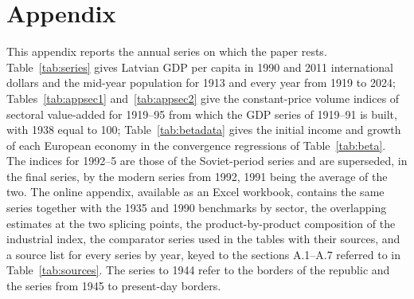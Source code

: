 \section*{Appendix}
\setcounter{table}{0}
\renewcommand{\thetable}{A\arabic{table}}

This appendix reports the annual series on which the paper rests. Table~\ref{tab:series} gives Latvian GDP per capita in 1990 and 2011 international dollars and the mid-year population for 1913 and every year from 1919 to 2024; Tables~\ref{tab:appsec1} and~\ref{tab:appsec2} give the constant-price volume indices of sectoral value-added for 1919--95 from which the GDP series of 1919--91 is built, with 1938 equal to 100; Table~\ref{tab:betadata} gives the initial income and growth of each European economy in the convergence regressions of Table~\ref{tab:beta}. The indices for 1992--5 are those of the Soviet-period series and are superseded, in the final series, by the modern series from 1992, 1991 being the average of the two. The online appendix, available as an Excel workbook, contains the same series together with the 1935 and 1990 benchmarks by sector, the overlapping estimates at the two splicing points, the product-by-product composition of the industrial index, the comparator series used in the tables with their sources, and a source list for every series by year, keyed to the sections A.1--A.7 referred to in Table~\ref{tab:sources}. The series to 1944 refer to the borders of the republic and the series from 1945 to present-day borders.

\begin{singlespace}
\scriptsize






\clearpage

\end{singlespace}

